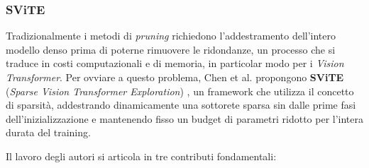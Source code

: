 \subsubsection{SViTE}
Tradizionalmente i metodi di \textit{pruning} richiedono l'addestramento
dell'intero modello denso prima di poterne rimuovere le ridondanze, un processo
che si traduce in costi computazionali e di memoria, in particolar modo per i
\textit{Vision Transformer}. Per ovviare a questo problema, Chen et al.
propongono \textbf{SViTE} (\textit{Sparse Vision Transformer Exploration})
\cite{chen2021chasingsparsityvisiontransformers}, un framework che utilizza il
concetto di sparsità, addestrando dinamicamente una sottorete sparsa sin dalle
prime fasi dell'inizializzazione e mantenendo fisso un budget di parametri
ridotto per l'intera durata del training. \par
Il lavoro degli autori si articola in tre contributi fondamentali:
